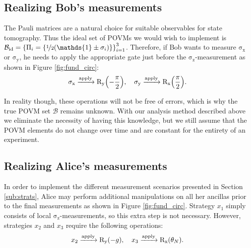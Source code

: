 \documentclass[aps,pra,twocolumn,superscriptaddress,showemail,showpacs,longbibliography]{revtex4-2}
\newcommand{\id}{\mathds{1}} %
\newcommand{\sigmax}{\operatorname{\sigma_x}}
\newcommand{\sigmay}{\operatorname{\sigma_y}}
\newcommand{\sigmaz}{\operatorname{\sigma_z}}
\newcommand{\Op}[1]{\ensuremath{\mathrm{#1}}}
\begin{document}
\subsection{Realizing Bob's measurements}
The Pauli matrices are a natural choice for suitable observables for state tomography. Thus the ideal set of POVMs we would wish to implement is $\mathcal{B}_\text{id} = \qty{\Pi_i = \qty{\nicefrac{1}{2} \qty(\id \pm \sigma_i)}}_{i=1}^3$. Therefore, if Bob wants to measure $\sigmax$ or $\sigmay$, he needs to apply the appropriate gate just before the $\sigmaz$-measurement as shown in Figure \ref{fig:fund_circ}:
\begin{equation}
    \sigmax \xrightarrow{\text{apply}} \Op{R_y}\qty(-\frac{\pi}{2}) \qc \sigmay \xrightarrow{\text{apply}} \Op{R_x}\qty(\frac{\pi}{2}).
\end{equation}

In reality though, these operations will not be free of errors, which is why the true POVM set $\mathcal{B}$ remains unknown. With our analysis method described above we eliminate the necessity of having this knowledge, but we still assume that the POVM elements do not change over time and are constant for the entirety of an experiment.

\subsection{Realizing Alice's measurements}
In order to implement the different measurement scenarios presented in Section \ref{sub:strats}, Alice may perform additional manipulations on all her ancillas prior to the final measurements as shown in Figure \ref{fig:fund_circ}. Strategy $x_1$ simply consists of local $\sigmaz$-measurements, so this extra step is not necessary. However, strategies $x_2$ and $x_3$ require the following operations:
\begin{equation}
    x_2 \xrightarrow{\text{apply}} \Op{R_y}(-g) \qc x_3 \xrightarrow{\text{apply}} \Op{R_x}\qty(\theta_N).
\end{equation}
\end{document}
